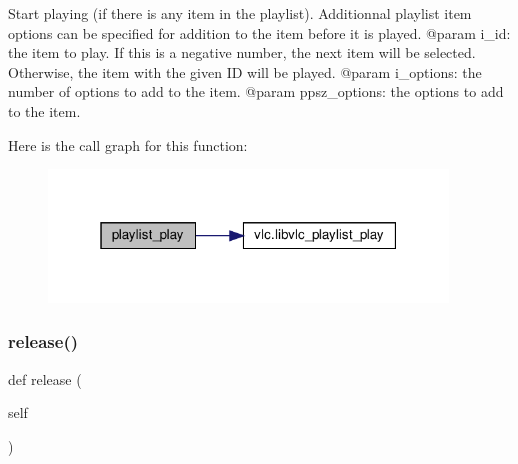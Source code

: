 \begin{DoxyVerb}Start playing (if there is any item in the playlist).
Additionnal playlist item options can be specified for addition to the
item before it is played.
@param i_id: the item to play. If this is a negative number, the next item will be selected. Otherwise, the item with the given ID will be played.
@param i_options: the number of options to add to the item.
@param ppsz_options: the options to add to the item.
\end{DoxyVerb}
 Here is the call graph for this function\+:
\nopagebreak
\begin{figure}[H]
\begin{center}
\leavevmode
\includegraphics[width=301pt]{classvlc_1_1_instance_a411dd250dfc733b33edb8fb676e51ad4_cgraph}
\end{center}
\end{figure}
\mbox{\label{classvlc_1_1_instance_a4cd51e19135e5ad4a19eae3ea9c60537}} 
\subsubsection{\texorpdfstring{release()}{release()}}
{\footnotesize\ttfamily def release (\begin{DoxyParamCaption}\item[{}]{self }\end{DoxyParamCaption})}

